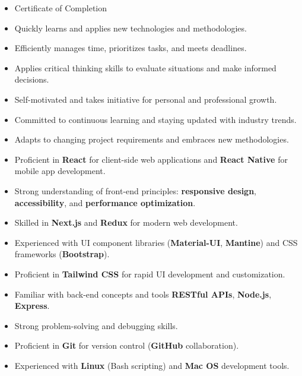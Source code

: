 \documentclass[9pt,a4paper,withhyper]{altacv}
\begin{document}
\begin{paracol}{2}
  \begin{itemize}
    \item Certificate of Completion
  \end{itemize}
  \begin{itemize}
    \item Quickly learns and applies new technologies and methodologies.
    \item Efficiently manages time, prioritizes tasks, and meets deadlines.
    \item Applies critical thinking skills to evaluate situations and make informed decisions.
    \item Self-motivated and takes initiative for personal and professional growth.
    \item Committed to continuous learning and staying updated with industry trends.
    \item Adapts to changing project requirements and embraces new methodologies.
  \end{itemize}
  \divider
  \begin{itemize}
    \item Proficient in \textbf{React} for client-side web applications and \textbf{React Native} for mobile app development.
    \item Strong understanding of front-end principles: \textbf{responsive design}, \textbf{accessibility}, and \textbf{performance optimization}.
    \item Skilled in \textbf{Next.js} and \textbf{Redux} for modern web development.
    \item Experienced with UI component libraries (\textbf{Material-UI}, \textbf{Mantine}) and CSS frameworks (\textbf{Bootstrap}).
    \item Proficient in \textbf{Tailwind CSS} for rapid UI development and customization.
    \item Familiar with back-end concepts and tools \textbf{RESTful APIs}, \textbf{Node.js}, \textbf{Express}.
    \item Strong problem-solving and debugging skills.
    \item Proficient in \textbf{Git} for version control (\textbf{GitHub} collaboration).
    \item Experienced with \textbf{Linux} (Bash scripting) and \textbf{Mac OS} development tools.
  \end{itemize}

\end{paracol}
\end{document}
